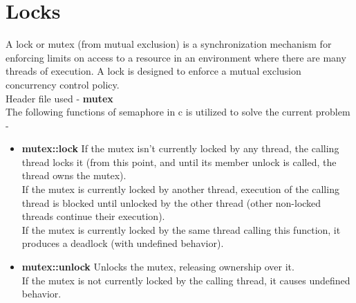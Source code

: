 \documentclass[12pt]{article}
\begin{document}
\section{Locks}
A lock or mutex (from mutual exclusion) is a synchronization mechanism for enforcing limits on access to a resource in an environment where there are many threads of execution. A lock is designed to enforce a mutual exclusion concurrency control policy.\\
Header file used - \textbf{mutex}\\
The following functions of semaphore in c is  utilized to solve the current problem - \\
\begin{itemize}
\item \textbf{mutex::lock}
If the mutex isn't currently locked by any thread, the calling thread locks it (from this point, and until its member unlock is called, the thread owns the mutex).\\
If the mutex is currently locked by another thread, execution of the calling thread is blocked until unlocked by the other thread (other non-locked threads continue their execution).\\
If the mutex is currently locked by the same thread calling this function, it produces a deadlock (with undefined behavior).\\
\item \textbf{mutex::unlock}
Unlocks the mutex, releasing ownership over it.\\
If the mutex is not currently locked by the calling thread, it causes undefined behavior.
\end{itemize}
\end{document}
